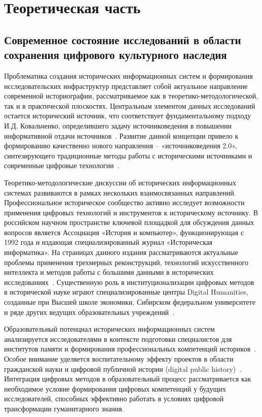 \chapter{Теоретическая часть}


\section{Современное состояние исследований в области сохранения цифрового культурного наследия}

Проблематика создания исторических информационных систем и формирования исследовательских инфраструктур представляет собой актуальное направление современной историографии, рассматриваемое как в теоретико-методологической, так и в практической плоскостях.
Центральным элементом данных исследований остается исторический источник, что соответствует фундаментальному подходу И.Д. Ковальченко, определившего задачу источниковедения в повышении информативной отдачи источников~\cite{1_kid2003}.
Развитие данной концепции привело к формированию качественно нового направления – «источниковедения 2.0», синтезирующего традиционные методы работы с историческими источниками и современные цифровые технологии~\cite{2_kornev2018}.

Теоретико-методологические дискуссии об исторических информационных системах развиваются в рамках нескольких взаимосвязанных направлений.
Профессиональное историческое сообщество активно исследует возможности применения цифровых технологий и инструментов к историческому источнику.
В российском научном пространстве ключевой площадкой для обсуждения данных вопросов является Ассоциация «История и компьютер», функционирующая с 1992 года и издающая специализированный журнал «Историческая информатика».
На страницах данного издания рассматриваются актуальные проблемы применения трехмерных реконструкций, технологий искусственного интеллекта и методов работы с большими данными в исторических исследованиях~\cite{3_belova1993}.
Существенную роль в институционализации цифровых методов в исторической науке играют специализированные центры Digital Humanities, созданные при Высшей школе экономики, Сибирском федеральном университете и ряде других ведущих образовательных учреждений~\cite{4_vladimirov2014}.

Образовательный потенциал исторических информационных систем анализируется исследователями в контексте подготовки специалистов для институтов памяти и формирования профессиональных компетенций историков~\cite{5_redkina2021}.
Особое внимание уделяется воспитательному эффекту проектов в области гражданской науки и цифровой публичной истории (digital public history)~\cite{6_barabucci2022}.
Интеграция цифровых методов в образовательный процесс рассматривается как необходимое условие формирования цифровых компетенций у будущих исследователей, способных эффективно работать в условиях цифровой трансформации гуманитарного знания.

